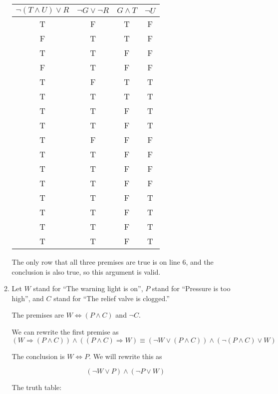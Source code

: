 \documentclass{article}
\begin{document}
\begin{enumerate}
\begin{enumerate}
    \begin{tabular}{c c c c}
      $\lnot (T \land U) \lor R$ & $\lnot G \lor \lnot R$ & $G \land T$ & $\lnot U$ \\ \hline
      T & F & T & F \\
      F & T & T & F \\
      T & T & F & F \\
      F & T & F & F \\
      T & F & T & T \\
      T & T & T & T \\
      T & T & F & T \\
      T & T & F & T \\
      T & F & F & F \\
      T & T & F & F \\
      T & T & F & F \\
      T & T & F & F \\
      T & T & F & T \\
      T & T & F & T \\
      T & T & F & T \\
      T & T & F & T \\
    \end{tabular}

    The only row that all three premises are true is on line 6, and the conclusion is also true, so this argument is valid.

  \item
    Let $W$ stand for ``The warning light is on'', $P$ stand for ``Pressure is too high'', and $C$ stand for ``The relief valve is clogged.''

    The premises are $W \iff (P \land C)$ and $\lnot C$.

    We can rewrite the first premise as
    \begin{equation*}
      (W \Rightarrow (P \land C)) \land ((P \land C) \Rightarrow W) \equiv (\lnot W \lor (P \land C)) \land (\lnot (P \land C) \lor W)
    \end{equation*}

    The conclusion is $W \iff P$. We will rewrite this as

    \begin{equation*}
      (\lnot W \lor P) \land (\lnot P \lor W)
    \end{equation*}

    The truth table:


\end{enumerate}
\end{enumerate}
\end{document}

